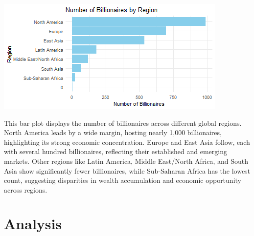 \documentclass[11pt,preprint]{elsarticle}
\let\origfigure\figure
\let\endorigfigure\endfigure
\renewenvironment{figure}[1][2] {
    \expandafter\origfigure\expandafter[H]
} {
    \endorigfigure
}
\numberwithin{equation}{section}
\numberwithin{figure}{section}
\numberwithin{table}{section}
\begin{document}
\begin{figure}

{\centering \includegraphics{23084103_Billionaires_files/figure-latex/Figure 1b-1} 

}

\caption{Caption Here \label{Figure1}}\label{fig:Figure 1b}
\end{figure}

This bar plot displays the number of billionaires across different
global regions. North America leads by a wide margin, hosting nearly
1,000 billionaires, highlighting its strong economic concentration.
Europe and East Asia follow, each with several hundred billionaires,
reflecting their established and emerging markets. Other regions like
Latin America, Middle East/North Africa, and South Asia show
significantly fewer billionaires, while Sub-Saharan Africa has the
lowest count, suggesting disparities in wealth accumulation and economic
opportunity across regions.

\section{Analysis}\label{analysis}
\end{document}
